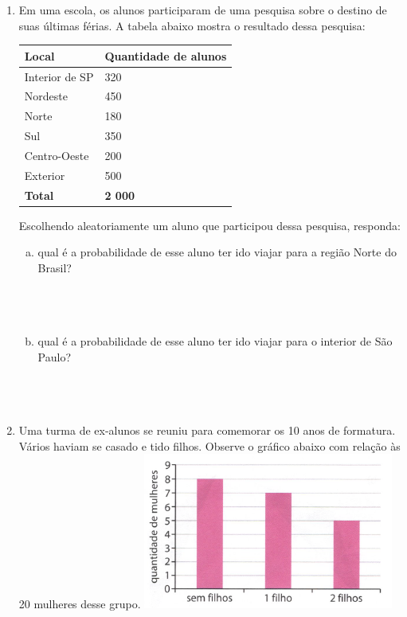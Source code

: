 \documentclass[a4paper,14pt]{article}
\begin{document}
\begin{multicols}{2}
\begin{enumerate}
\begin{enumerate}[a)]
	    	\end{enumerate}
	    	\item Em uma escola, os alunos participaram de uma pesquisa sobre o destino de suas últimas férias. A tabela abaixo mostra o resultado dessa pesquisa:
	    	\begin{table}[H]
	    		\renewcommand{\arraystretch}{1.2} %
	    		\begin{tabular}{|m{4cm}|m{4cm}|}
	    			\hline
	    			\textbf{Local} & \textbf{Quantidade de alunos} \\ \hline
	    			Interior de SP & 320 \\ \hline
	    			Nordeste & 450 \\ \hline
	    			Norte & 180  \\ \hline
	    			Sul & 350 \\ \hline
	    			Centro-Oeste & 200 \\ \hline
	    			Exterior & 500 \\ \hline
	    			\textbf{Total} & \textbf{2 000} \\ \hline
	    		\end{tabular}
	    	\end{table}
	    	Escolhendo aleatoriamente um aluno que participou dessa pesquisa, responda: \newpage
	    	\begin{enumerate}[a)]
	    		\item qual é a probabilidade de esse aluno ter ido viajar para a região Norte do Brasil?
	    		\\\\\\\\
	    		\item qual é a probabilidade de esse aluno ter ido viajar para o interior de São Paulo?
	    		\\\\\\\\
	    	\end{enumerate}
	    	\item Uma turma de ex-alunos se reuniu para comemorar os 10 anos de formatura. Vários haviam se casado e tido filhos. Observe o gráfico abaixo com relação às 20 mulheres desse grupo.
	    	\includegraphics[width=1\linewidth]{6FMA121_imagens/imagem3}

\end{enumerate}
\end{multicols}
\end{document}
